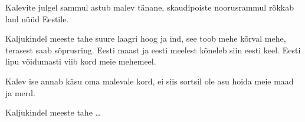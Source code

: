 Kalevite julgel sammul
astub malev t\"anane,
skaudipoiste noorusrammul 
r\~okkab laul n\"u\"ud Eestile.

Kaljukindel meeste tahe 
suure laagri hoog ja ind,
see toob mehe k\~orval mehe, 
terasest saab s\~oprusring.
Eesti maast ja eesti meelest
k\~oneleb siin eesti keel.
Eesti lipu v\~oidumasti 
viib kord meie mehemeel.

\clearpage Kalev ise annab k\"asu
oma malevale kord,
ei siis sortsil ole asu
hoida meie maad ja merd.

Kaljukindel meeste tahe \ldots